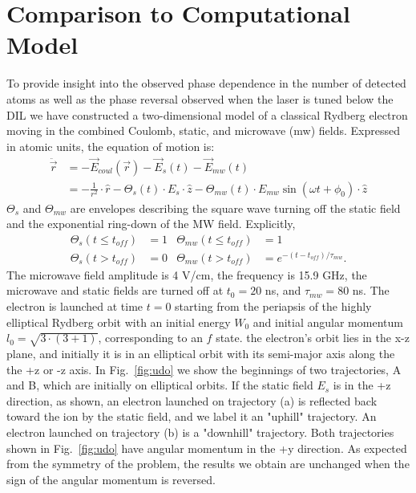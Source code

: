 \documentclass[aps,pra,preprint,groupedaddress]{revtex4-1}
\begin{document}
\section{\label{sec:disc} Comparison to Computational Model}

To provide insight into the observed phase dependence in the number of detected atoms as well as the phase reversal observed when the laser is tuned below the DIL we have constructed a two-dimensional model of a classical Rydberg electron moving in the combined Coulomb, static, and microwave (mw) fields. Expressed in atomic units, the equation of motion is:
\begin{align*}
\ddot{\vec{r}} & = -\vec{E}_{coul}(\vec{r}) - \vec{E}_{s}(t) - \vec{E}_{mw}(t) \\
 & = -\frac{1}{r^2} \cdot \hat{r} - \Theta_s(t) \cdot E_{s} \cdot \hat{z} - \Theta_{mw}(t) \cdot E_{mw} \sin{(\omega t + \phi_0)} \cdot \hat{z}
\end{align*}
$\Theta_s$ and $\Theta_{mw}$ are envelopes describing the square wave turning off the static  field and the exponential ring-down of the MW field. Explicitly,
\begin{align*}
\Theta_s(t \leq t_{off}) & = 1 & \Theta_{mw}(t \leq t_{off}) & = 1 \\
\Theta_s(t > t_{off}) & = 0 & \Theta_{mw}(t > t_{off}) & = e^{-(t-t_{off})/\tau_{mw}}.
\end{align*}
The microwave field amplitude is 4 V/cm, the frequency is 15.9 GHz, the microwave and static fields are turned off at $t_0 = 20$ ns, and $\tau_{mw} = 80$ ns. The electron is launched at time $t=0$ starting from the periapsis of the highly elliptical Rydberg orbit with an initial energy $W_0$ and initial angular momentum $l_0 = \sqrt{3 \cdot (3+1)}$, corresponding to an $f$ state. the electron's orbit lies in the x-z plane, and initially it is in an elliptical orbit with its semi-major axis along the the +z or -z axis. In Fig.~\ref{fig:udo} we show the beginnings of two trajectories, A and B, which are initially on elliptical orbits. If the static field $E_s$ is in the +z direction, as shown, an electron launched on trajectory (a) is reflected back toward the ion by the static field, and we label it an "uphill" trajectory. An electron launched on trajectory (b) is a "downhill" trajectory. Both trajectories shown in Fig.~\ref{fig:udo} have angular momentum in the +y direction. As expected from the symmetry of the problem, the results we obtain are unchanged when the sign of the angular momentum is reversed.
\end{document}
